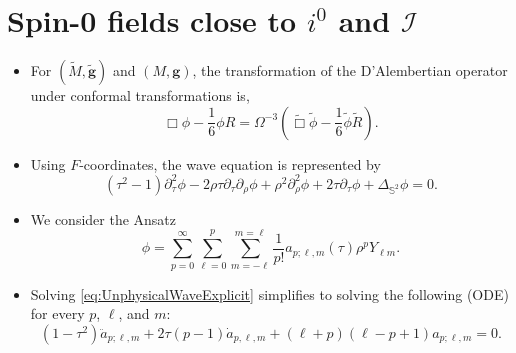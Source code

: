 \documentclass{beamer}
\theoremstyle{remark}
\theoremstyle{plain}
\theoremstyle{plain}
\begin{document}
\section{Spin-0 fields close to $i^0$ and $\mathscr{I}$}
\begin{frame}
  \begin{itemize}
    \item For $(\tilde{M},\tilde{\boldsymbol{g}})$ and $(M,\boldsymbol{g})$, the transformation of the D'Alembertian operator under conformal transformations is,
    \begin{equation}\label{eq:waveConfTr}
      \Box \phi-\frac{1}{6} \phi R=\Omega^{-3}\left(\tilde{\Box} \tilde{\phi}-\frac{1}{6} \tilde{\phi} \tilde{R}\right).
    \end{equation}
    \item Using $F$-coordinates, the wave equation is represented by
    \begin{equation}\label{eq:UnphysicalWaveExplicit}
      \left(\tau^2-1\right) \partial_\tau^2 \phi-2 \rho \tau \partial_\tau \partial_\rho \phi+\rho^2 \partial_\rho^2 \phi+2 \tau \partial_\tau \phi+\Delta_{\mathbb{S}^2} \phi=0.
    \end{equation}
    \item We consider the Ansatz
    \begin{equation}\label{eq:ansatz}
      \phi = \sum_{p = 0}^{\infty}\sum_{\ell = 0}^{p}\sum_{m = -\ell}^{m = \ell}\frac{1}{p!}a_{p;\ell,m}(\tau)\rho^{p}Y_{\ell m}.
    \end{equation}
    \item Solving \eqref{eq:UnphysicalWaveExplicit} simplifies to solving the following (ODE) for every $p$, $\ell$, and $m$:
    \begin{equation}\label{eq:ODE_wave_JacobiPoly}
      (1-\tau^2)\ddot{a}_{p;\ell,m} + 2\tau(p-1)\dot{a}_{p,\ell,m}+(\ell+p)(\ell-p+1){a}_{p;\ell,m}=0.
    \end{equation}
  \end{itemize}
\end{frame}
\end{document}
